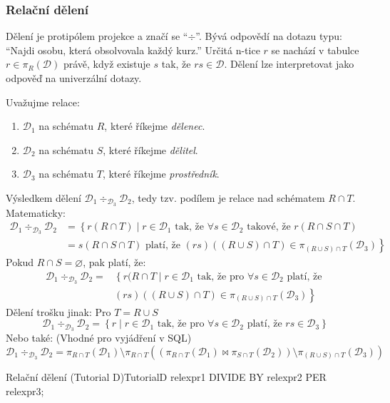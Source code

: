 \subsubsection{Relační dělení}
Dělení je protipólem projekce a značí se \enquote{$\div$}. Bývá odpovědí na dotazu typu: \enquote{Najdi osobu, která obsolvovala každý kurz.} Určitá n-tice $r$ se nachází v tabulce $r \in \pi_{R} (\mathcal{D})$ právě, když existuje $s$ tak, že $rs \in \mathcal{D}$. Dělení lze interpretovat jako odpověď na univerzální dotazy.

Uvažujme relace:
\begin{enumerate}
\item $\mathcal{D}_{1}$ na schématu $R$, které říkejme \textit{dělenec}.
\item $\mathcal{D}_{2}$ na schématu $S$, které říkejme \textit{dělitel}.
\item $\mathcal{D}_{3}$ na schématu $T$, které říkejme \textit{prostředník}.
\end{enumerate}
Výsledkem dělení $\mathcal{D}_{1} \div_{\mathcal{D}_{3}} \mathcal{D}_{2}$, tedy tzv. podílem je relace nad schématem $R \cap T$. Matematicky:
\begin{align*}
\mathcal{D}_{1} \div_{\mathcal{D}_{3}} \mathcal{D}_{2} &= \left\{ r(R \cap T) \; | \; r \in \mathcal{D}_{1} \text{ tak, že } \forall s \in \mathcal{D}_{2} \text{ takové, že } r(R \cap S \cap T) \right. \\
&\left.= s(R \cap S \cap T) \text{ platí, že } (rs) ((R \cup S) \cap T) \in \pi_{(R \cup S) \cap T} (\mathcal{D}_{3}) \right\}
\end{align*}
Pokud $R \cap S = \varnothing$, pak platí, že:
\begin{align*}
\mathcal{D}_{1} \div_{\mathcal{D}_{3}} \mathcal{D}_{2} = &\left\{ r(R \cap T \; | \;  r \in \mathcal{D}_{1} \text{ tak, že pro } \forall s \in \mathcal{D}_{2}  \text{ platí, že } \right. \\
&\left.(rs) \left( \left(R \cup S\right) \cap T\right) \in \pi_{(R \cup S) \cap T} (\mathcal{D}_{3}) \right\}
\end{align*}
Dělení trošku jinak: Pro $ T = R \cup S$ 
$$
\mathcal{D}_{1} \div_{\mathcal{D}_{3}} \mathcal{D}_{2} = \left\{ r \; | \; r \in \mathcal{D}_{1} \text{ tak, že pro } \forall s \in \mathcal{D}_{2} \text{ platí, že } rs \in \mathcal{D}_{3} \right\}
$$
Nebo také: (Vhodné pro vyjádření v SQL)
$$
\mathcal{D}_{1} \div_{\mathcal{D}_{3}} \mathcal{D}_{2} = \pi_{R \cap T} \left( \mathcal{D}_{1} \right) \setminus \pi_{R \cap T} \left( \left( \pi_{R \cap T} \left( \mathcal{D}_{1} \right) \Join \pi_{S \cap T} \left( \mathcal{D}_{2} \right) \right) \setminus \pi_{(R \cup S) \cap T} \left( \mathcal{D}_{3}  \right) \right) %
$$
\begin{upcode}{Relační dělení (Tutorial D)}{}{TutorialD}
relexpr1 DIVIDE BY relexpr2 PER relexpr3;
\end{upcode}

